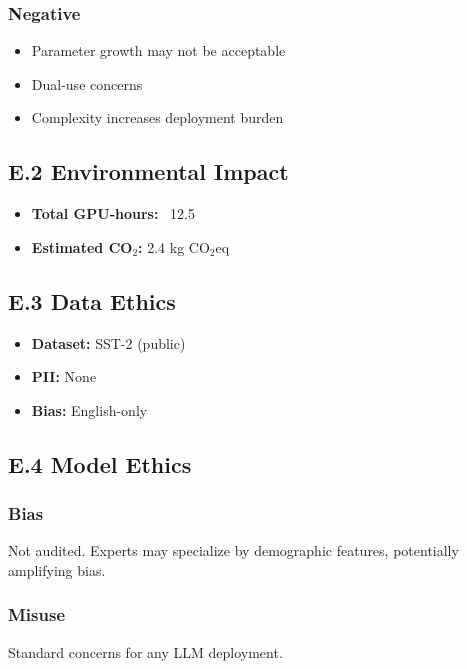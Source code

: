 \subsubsection{Negative}
\begin{itemize}
\item Parameter growth may not be acceptable
\item Dual-use concerns
\item Complexity increases deployment burden

\end{itemize}
\subsection{E.2 Environmental Impact}

\begin{itemize}
\item \textbf{Total GPU-hours:} ~12.5
\item \textbf{Estimated CO$_2$:} 2.4 kg CO$_2$eq

\end{itemize}
\subsection{E.3 Data Ethics}

\begin{itemize}
\item \textbf{Dataset:} SST-2 (public)
\item \textbf{PII:} None
\item \textbf{Bias:} English-only

\end{itemize}
\subsection{E.4 Model Ethics}

\subsubsection{Bias}

Not audited. Experts may specialize by demographic features, potentially 
amplifying bias.

\subsubsection{Misuse}

Standard concerns for any LLM deployment.

